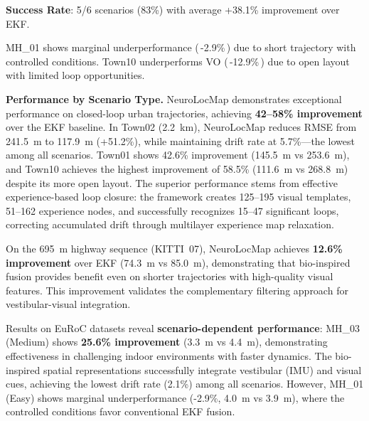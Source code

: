 \begin{table}[!t]
\begin{threeparttable}
\begin{tabular}{@{}llcccccc@{}}
            \bottomrule
        \end{tabular}
        \begin{tablenotes}
            \scriptsize
            \item \textbf{Success Rate}: 5/6 scenarios (83\%) with average +38.1\% improvement over EKF.
            \item MH\_01 shows marginal underperformance (\,-2.9\%\,) due to short trajectory with controlled conditions. Town10 underperforms VO (\,-12.9\%\,) due to open layout with limited loop opportunities.
        \end{tablenotes}
    \end{threeparttable}
\end{table}

\textbf{Performance by Scenario Type.} NeuroLocMap demonstrates exceptional per\-for\-mance on closed-loop urban trajectories, achieving \textbf{42--58\% improvement} over the EKF baseline. In Town02 (2.2~km), NeuroLocMap reduces RMSE from 241.5~m to 117.9~m (+51.2\%), while maintaining drift rate at 5.7\%---the lowest among all scenarios. Town01 shows 42.6\% improvement (145.5~m vs 253.6~m), and Town10 achieves the highest improvement of 58.5\% (111.6~m vs 268.8~m) despite its more open layout. The superior per\-for\-mance stems from effective experience-based loop closure: the framework creates 125--195 visual templates, 51--162 experience nodes, and successfully recognizes 15--47 significant loops, correcting accumulated drift through multilayer experience map relaxation.

On the 695~m highway sequence (KITTI~07), NeuroLocMap achieves \textbf{12.6\% improvement} over EKF (74.3~m vs 85.0~m), demonstrating that bio-inspired fusion provides benefit even on shorter trajectories with high-quality visual features. This improvement validates the complementary filtering approach for ves\-tib\-u\-lar-visual integration.

Results on EuRoC datasets reveal \textbf{scenario-dependent per\-for\-mance}: MH\_03 (Medium) shows \textbf{25.6\% improvement} (3.3~m vs 4.4~m), demonstrating effectiveness in challenging indoor environments with faster dynamics. The bio-inspired spatial representations successfully integrate ves\-tib\-u\-lar (IMU) and visual cues, achieving the lowest drift rate (2.1\%) among all scenarios. However, MH\_01 (Easy) shows marginal underperformance (-2.9\%, 4.0~m vs 3.9~m), where the controlled conditions favor conventional EKF fusion.

